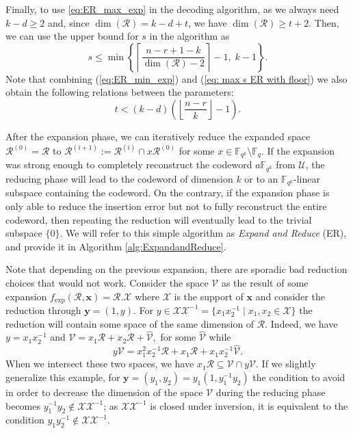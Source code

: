 \documentclass{article}
\newcommand{\Fq}{\mathbb{F}_{q}}
\newcommand{\Fqk}{\mathbb{F}_{q^k}}
\newcommand{\calR}{\mathcal{R}}
\newcommand{\calU}{\mathcal{U}}
\newcommand{\calV}{\mathcal{V}}
\newcommand{\calX}{\mathcal{X}}
\newcommand{\fexp}{f_{\mathrm{exp}}}
\begin{document}
Finally, to use \eqref{eq:ER_max_exp} in the decoding algorithm, as we always need $k - d \geq 2$ and, since $\dim(\mathcal{R}) = k - d + t$, we have $\dim(\mathcal{R}) \geq t + 2$.  
Then, we can use the upper bound for $s$ in the algorithm as
\begin{equation}
\label{eq:max_exp_ER}
    s \leq \min \left\{\left\lceil \frac{n - r + 1 - k}{\dim(\mathcal{R}) - 2} \right\rceil - 1,\; k - 1 \right\}.
\end{equation}
Note that combining (\ref{eq:ER_min_exp}) and (\ref{eq: max s ER with floor}) we also obtain the following relations between the parameters:
\begin{equation}
    \label{eq:ER_max_t_duplicate}
    t < (k-d)\left (  \left \lfloor \frac{n-r}{k} \right \rfloor - 1\right ).
\end{equation}
\par After the expansion phase, we can iteratively reduce the expanded space $\calR^{(0)}=\calR$ to $\calR^{(i+1)} := \calR^{(i)} \cap x \calR^{(0)}$ for some $x \in \Fqk\setminus\Fq$.
If the expansion was strong enough to completely reconstruct the codeword $a \Fqk$ from $\calU$, the reducing phase will lead to the codeword of dimension $k$ or to an $\Fqk$-linear subspace containing the codeword. On the contrary, if the expansion phase is only able to reduce the insertion error but not to fully reconstruct the entire codeword, then repeating the reduction will eventually lead to the trivial subspace $\{0\}$.
We will refer to this simple algorithm as \textit{Expand and Reduce} (ER), and provide it in Algorithm \ref{alg:ExpandandReduce}. 
\\
\par Note that depending on the previous expansion, there are sporadic bad reduction choices that would not work. Consider the space $\calV$ as the result of some expansion $\fexp(\calR, \bm x) = \calR.\calX$ where $\calX$ is the support of $\bm x$ and consider the reduction through $\bm y = (1,y).$
For $y \in \calX \calX^{-1} = \{x_1 x_2^{-1} \mid x_1, x_2 \in \calX \}$ the reduction will contain some space of the same dimension of $\calR$.
Indeed, we have $y = x_1 x_2^{-1}$ and 
$
    \calV = x_1 \calR + x_2 \calR + \hat{\calV},
$
for some $\hat{\calV}$ while 
$$
    y \calV= x_1^2 x_2^{-1}\calR + x_1 \calR + x_1 x_2^{-1} \hat{\calV}.
$$
When we intersect these two spaces, we have $x_1 \calR \subseteq \calV \cap y \calV.$
If we slightly generalize this example, for $\bm y =(y_1,y_2) = y_1(1,y_1^{-1} y_2)$ the condition to avoid in order to decrease the dimension of the space $\calV$ during the reducing phase becomes $y_1^{-1} y_2 \notin \calX \calX^{-1}$; as $\calX \calX^{-1}$ is closed under inversion, it is equivalent to the condition $y_1 y_2^{-1} \notin \calX \calX^{-1}$.
\end{document}
